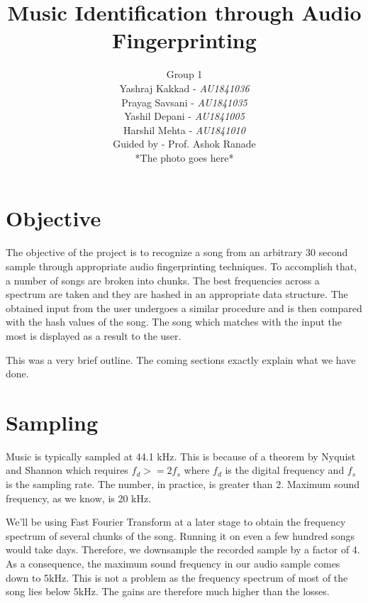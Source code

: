\documentclass[12pt, a4paper]{IEEEtran}
\begin{document}
\title{Music Identification through Audio Fingerprinting}

\author{
    \vspace{10mm}
    \huge
    Group 1 \\
    \vspace{3mm}
    \LARGE
    Yashraj Kakkad - \textit{AU1841036} \\ 
    Prayag Savsani - \textit{AU1841035} \\
    Yashil Depani - \textit{AU1841005} \\ 
    Harshil Mehta - \textit{AU1841010} \\
\vspace{3mm}
Guided by - Prof. Ashok Ranade \\
\null \vfill
*The photo goes here*
}



\section{Objective}
The objective of the project is to recognize a song from an arbitrary 30 second sample through appropriate audio fingerprinting techniques.
To accomplish that, a number of songs are broken into chunks. The best frequencies across a spectrum are taken and they are hashed in an appropriate data structure.
The obtained input from the user undergoes a similar procedure and is then compared with the hash values of the song. The song which matches with the input the most is displayed as a result to the user.
\par
This was a very brief outline. The coming sections exactly explain what we have done.

\section{Sampling}
Music is typically sampled at 44.1 kHz. This is because of a theorem by Nyquist and Shannon which requires \(f_d >= 2f_s\) where \(f_d\) is the digital frequency and \(f_s\) is the sampling rate. The number, in practice, is greater than 2. Maximum sound frequency, as we know, is 20 kHz.
\par
We'll be using Fast Fourier Transform at a later stage to obtain the frequency spectrum of several chunks of the song. Running it on even a few hundred songs would take days.
Therefore, we downsample the recorded sample by a factor of 4. 
As a consequence, the maximum sound frequency in our audio sample comes down to 5kHz. This is not a problem as the frequency spectrum of most of the song lies below 5kHz. The gains are therefore much higher than the losses.
\end{document}
